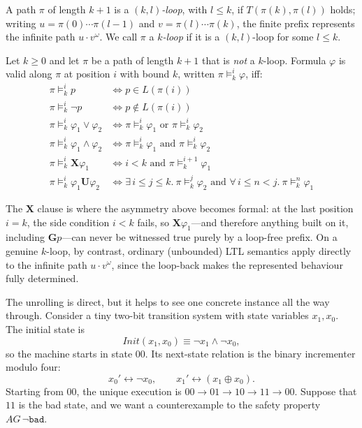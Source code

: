 \begin{definition}[$(k,l)$-loop]
A path $\pi$ of length $k+1$ is a \emph{$(k,l)$-loop}, with $l \leq k$, if
$T(\pi(k), \pi(l))$ holds; writing $u = \pi(0)\cdots\pi(l-1)$ and
$v = \pi(l)\cdots\pi(k)$, the finite prefix represents the infinite path
$u \cdot v^\omega$.  We call $\pi$ a \emph{$k$-loop} if it is a
$(k,l)$-loop for some $l \leq k$.
\end{definition}

\begin{definition}
Let $k \geq 0$ and let $\pi$ be a path of length $k+1$ that is \emph{not} a
$k$-loop.  Formula $\varphi$ is valid along $\pi$ at position $i$ with
bound $k$, written $\pi \models_k^i \varphi$, iff:
\begin{align*}
  \pi \models_k^i p              &\iff p \in L(\pi(i)) \\
  \pi \models_k^i \neg p         &\iff p \notin L(\pi(i)) \\
  \pi \models_k^i \varphi_1 \lor \varphi_2 &\iff
    \pi \models_k^i \varphi_1 \text{ or } \pi \models_k^i \varphi_2 \\
  \pi \models_k^i \varphi_1 \land \varphi_2 &\iff
    \pi \models_k^i \varphi_1 \text{ and } \pi \models_k^i \varphi_2 \\
  \pi \models_k^i \mathbf{X}\varphi_1 &\iff
    i < k \text{ and } \pi \models_k^{i+1} \varphi_1 \\
  \pi \models_k^i \varphi_1 \mathbf{U} \varphi_2 &\iff
    \exists\, i \leq j \leq k.\ \pi \models_k^j \varphi_2
    \text{ and } \forall\, i \leq n < j.\ \pi \models_k^n \varphi_1
\end{align*}
\end{definition}
The $\mathbf{X}$ clause is where the asymmetry above becomes formal: at the
last position $i = k$, the side condition $i < k$ fails, so
$\mathbf{X}\varphi_1$---and therefore anything built on it, including
$\mathbf{G}p$---can never be witnessed true purely by a loop-free prefix.
On a genuine $k$-loop, by contrast, ordinary (unbounded) LTL semantics apply
directly to the infinite path $u \cdot v^\omega$, since the loop-back makes
the represented behaviour fully determined.

The unrolling is direct, but it helps to see one concrete instance all the way
through.  Consider a tiny two-bit transition system with state variables
$x_1,x_0$.  The initial state is
\[
  Init(x_1,x_0) \equiv \neg x_1 \land \neg x_0,
\]
so the machine starts in state $00$.  Its next-state relation is the binary
incrementer modulo four:
\[
  x_0' \leftrightarrow \neg x_0, \qquad
  x_1' \leftrightarrow (x_1 \oplus x_0).
\]
Starting from $00$, the unique execution is $00 \to 01 \to 10 \to 11 \to 00$.
Suppose that $11$ is the bad state, and we want a counterexample to the safety
property $AG\,\neg \texttt{bad}$.

